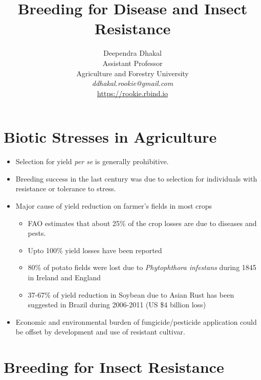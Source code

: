 \documentclass[10pt,dvipsnames,ignorenonframetext,aspectratio=169]{beamer}
\title[]{Breeding for Disease and Insect Resistance}
\author[
        \vspace{-0.5cm} Deependra Dhakal\\
Assistant Professor\\
Agriculture and Forestry University\\
\textit{ddhakal.rookie@gmail.com}\\
\url{https://rookie.rbind.io}
    ]{\vspace{-0.5cm} Deependra Dhakal\\
Assistant Professor\\
Agriculture and Forestry University\\
\textit{ddhakal.rookie@gmail.com}\\
\url{https://rookie.rbind.io}}
\date[
      
  ]{
    }
\providecommand{\tightlist}{%
  \setlength{\itemsep}{0pt}\setlength{\parskip}{0pt}}
\begin{document}
  \begin{frame}[plain]
  \titlepage
  \end{frame}



\hypertarget{biotic-stresses-in-agriculture}{%
\section{Biotic Stresses in
Agriculture}\label{biotic-stresses-in-agriculture}}

\begin{frame}{}
\protect\hypertarget{section}{}
\begin{itemize}
\tightlist
\item
  Selection for yield \emph{per se} is generally prohibitive.
\item
  Breeding success in the last century was due to selection for
  individuals with resistance or tolerance to stress.
\item
  Major cause of yield reduction on farmer's fields in most crops

  \begin{itemize}
  \tightlist
  \item
    FAO estimates that about 25\% of the crop losses are due to diseases
    and pests.
  \item
    Upto 100\% yield losses have been reported
  \item
    80\% of potato fields were lost due to
    \textit{Phytophthora infestans} during 1845 in Ireland and England
  \item
    37-67\% of yield reduction in Soybean due to Asian Rust has been
    suggested in Brazil during 2006-2011 (US \$4 billion loss)
  \end{itemize}
\item
  Economic and environmental burden of fungicide/pesticide application
  could be offset by development and use of resistant cultivar.
\end{itemize}
\end{frame}

\hypertarget{breeding-for-insect-resistance}{%
\section{Breeding for Insect
Resistance}\label{breeding-for-insect-resistance}}
\end{document}
